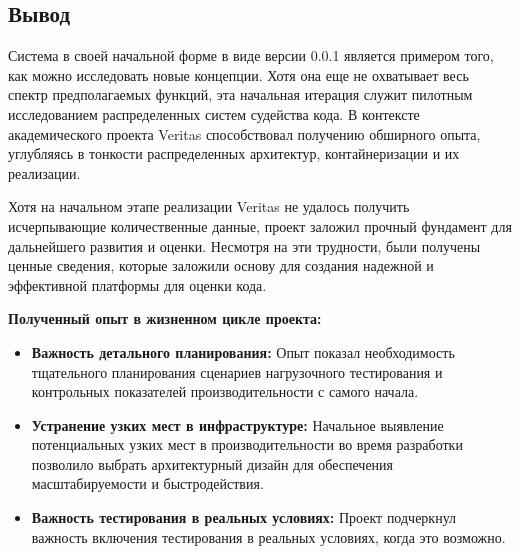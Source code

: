 \subsection{Вывод}
Система в своей начальной форме в виде версии 0.0.1 является примером того, как можно исследовать новые концепции. 
Хотя она еще не охватывает весь спектр предполагаемых функций, эта начальная итерация служит пилотным исследованием распределенных систем судейства кода.
В контексте академического проекта Veritas способствовал получению обширного опыта, углубляясь в тонкости распределенных архитектур, контайнеризации и их реализации. \newline

\noindent
Хотя на начальном этапе реализации Veritas не удалось получить исчерпывающие количественные данные, проект заложил прочный фундамент для дальнейшего развития и оценки.
Несмотря на эти трудности, были получены ценные сведения, которые заложили основу для создания надежной и эффективной платформы для оценки кода.

\noindent
\textbf{Полученный опыт в жизненном цикле проекта:}
\begin{itemize}
    \item \textbf{Важность детального планирования:} Опыт показал необходимость тщательного планирования сценариев нагрузочного тестирования и контрольных показателей производительности с самого начала.
    \item \textbf{Устранение узких мест в инфраструктуре:} Начальное выявление потенциальных узких мест в производительности во время разработки позволило выбрать архитектурный дизайн для обеспечения масштабируемости и быстродействия.
    \item \textbf{Важность тестирования в реальных условиях:} Проект подчеркнул важность включения тестирования в реальных условиях, когда это возможно.
\end{itemize}